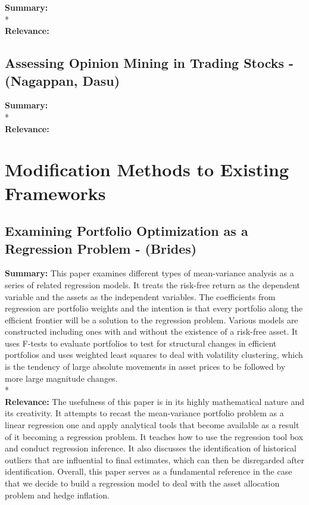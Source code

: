 \documentclass[11pt]{article}
\begin{document}
\textbf{Summary: }
\\*
\\
\textbf{Relevance: }

\pagebreak
\subsection{\textnormal{Assessing Opinion Mining in Trading Stocks - (Nagappan, Dasu)}}

\textbf{Summary: }
\\*
\\
\textbf{Relevance: }

\pagebreak

\section{Modification Methods to Existing Frameworks}

\subsection{\textnormal{Examining Portfolio Optimization as a Regression Problem - (Brides)}}

\textbf{Summary: }This paper examines different types of mean-variance analysis as a series of related regression models. It treats the risk-free return as the dependent variable and the assets as the independent variables. The coefficients from regression are portfolio weights and the intention is that every portfolio along the efficient frontier will be a solution to the regression problem. Various models are constructed including ones with and without the existence of a risk-free asset. It uses F-tests to evaluate portfolios to test for structural changes in efficient portfolios and uses weighted least squares to deal with volatility clustering, which is the tendency of large absolute movements in asset prices to be followed by more large magnitude changes. 
\\*
\\
\textbf{Relevance: }The usefulness of this paper is in its highly mathematical nature and its creativity. It attempts to recast the mean-variance portfolio problem as a linear regression one and apply analytical tools that become available as a result of it becoming a regression problem. It teaches how to use the regression tool box and conduct regression inference. It also discusses the identification of historical outliers that are influential to final estimates, which can then be disregarded after identification. Overall, this paper serves as a fundamental reference in the case that we decide to build a regression model to deal with the asset allocation problem and hedge inflation.
\end{document}
